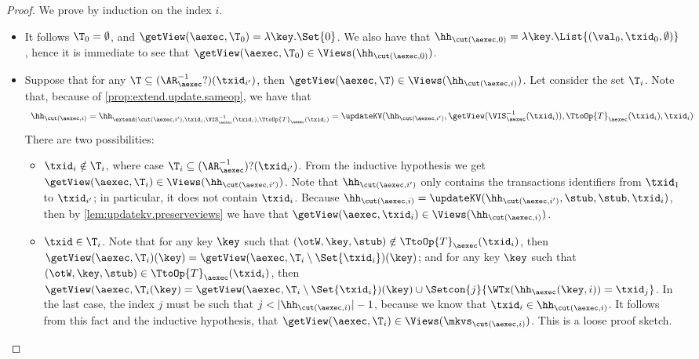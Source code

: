 \begin{proof}
We prove by induction on the index $i$. 
\begin{itemize}
\item {} It follows $\T_{0} = \emptyset$, and $\getView(\aexec, \T_{0}) = \lambda \key. \Set{0}$. 
We also have that $\hh_{\cut(\aexec, 0)} = \lambda \key. \List{(\val_0, \txid_{0}, \emptyset)}$, hence 
it is immediate to see that $\getView(\aexec, \T_{0}) \in \Views(\hh_{\cut(\aexec, 0)})$.

\item {}
Suppose that for any $\T \subseteq (\AR_{\aexec}^{-1}?)(\txid_{i'})$, 
then $\getView(\aexec, \T) \in \Views(\hh_{\cut(\aexec, i)})$. 
Let consider the set $\T_{i}$.
Note that, because of \cref{prop:extend.update.sameop}, we have that
\[
\begin{array}{l}
\hh_{\cut(\aexec, i)} =
\hh_{\extend(\cut(\aexec, i'), \txid_{i}, \VIS^{-1}_{\aexec}(\txid_{i}), \TtoOp{T}_{\aexec}(\txid_{i})} 
= \updateKV(\hh_{\cut(\aexec, i')}, \getView(\VIS^{-1}_{\aexec}(\txid_{i})), \TtoOp{T}_{\aexec}(\txid_{i}), \txid_{i})
\end{array}
\]
There are two possibilities:
\begin{itemize}
\item $\txid_{i} \notin \T_{i}$, where case $\T_{i} \subseteq (\AR_{\aexec}^{-1})?(\txid_{i'})$.
From the inductive hypothesis we get $\getView(\aexec, \T_{i}) \in \Views(\hh_{\cut(\aexec, i')})$. 
Note that $\hh_{\cut(\aexec, i')}$ only contains the transactions identifiers from $\txid_{1}$ to $\txid_{i'}$;
in particular, it does not contain $\txid_{i}$. 
Because $\hh_{\cut(\aexec, i)} = \updateKV(\hh_{\cut(\aexec, i')}, \stub, \stub, \txid_{i})$, 
then by \cref{lem:updatekv.preserveviews} we have that $\getView(\aexec, \txid_{i}) \in \Views(\hh_{\cut(\aexec, i)})$.

\item $\txid \in \T_{i}$. Note that for any key $\key$ such that 
$(\otW, \key, \stub) \notin \TtoOp{T}_{\aexec}(\txid_{i})$, then 
$\getView(\aexec, \T_{i})(\key) = \getView(\aexec, \T_{i} \setminus \Set{\txid_{i}})(\key)$; 
and for any key $\key$ such that $(\otW, \key, \stub) \in \TtoOp{T}_{\aexec}(\txid_{i})$, 
then $\getView(\aexec, \T_{i}(\key) = \getView(\aexec, \T_{i} \setminus \Set{\txid_{i}})(\key) 
\cup \Setcon{j }{ \WTx(\hh_{\aexec}(\key, i)) = \txid_{j}}$. 
In the last case, the index $j$ must be such that $j < \lvert \hh_{\cut(\aexec, i)} \rvert - 1$, 
because we know that $\txid_{i} \in \hh_{\cut(\aexec, i)}$. 
It follows from this fact and the inductive hypothesis, 
that $\getView(\aexec, \T_{i}) \in \Views(\mkvs_{\cut(\aexec, i)})$.
\ac{This is a loose proof sketch.} 
\end{itemize}
\end{itemize}
\end{proof}

